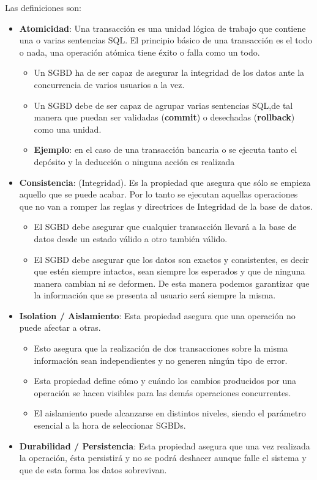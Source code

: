 Las definiciones son:

\begin{itemize}
    \item \textbf{Atomicidad}: Una transacción es una unidad lógica de trabajo que contiene una o varias sentencias SQL. El principio básico de una transacción es el todo o nada, una operación atómica tiene éxito o falla como un todo.
        \begin{itemize}
            \item Un SGBD ha de ser capaz de asegurar la integridad de los datos ante la concurrencia de varios usuarios a la vez.
            \item Un SGBD debe de ser capaz de agrupar varias sentencias SQL,de tal manera que puedan ser validadas (\textbf{commit}) o desechadas (\textbf{rollback}) como una unidad.
            \item \textbf{Ejemplo}: en el caso de una transacción bancaria o se ejecuta tanto el depósito y la deducción o ninguna acción es realizada
        \end{itemize}
    \item \textbf{Consistencia}: (Integridad). Es la propiedad que asegura que sólo se empieza aquello que se puede acabar. Por lo tanto se ejecutan aquellas operaciones que no van a romper las reglas y directrices de Integridad de la base de datos.
        \begin{itemize}
            \item El SGBD debe asegurar que cualquier transacción llevará a la base de datos desde un estado válido a otro también válido.
            \item El SGBD debe asegurar que los datos son exactos y consistentes, es decir que estén siempre intactos, sean siempre los esperados y que de ninguna manera cambian ni se deformen. De esta manera podemos garantizar que la información que se presenta al usuario será siempre la misma.
        \end{itemize}
    \item \textbf{Isolation / Aislamiento}: Esta propiedad asegura que una operación no puede afectar a otras.
        \begin{itemize}
            \item Esto asegura que la realización de dos transacciones sobre la misma información sean independientes y no generen ningún tipo de error.
            \item Esta propiedad define cómo y cuándo los cambios producidos por una operación se hacen visibles para las demás operaciones concurrentes.
            \item El aislamiento puede alcanzarse en distintos niveles, siendo el parámetro esencial a la hora de seleccionar SGBDs.
        \end{itemize}
    \item \textbf{Durabilidad / Persistencia}: Esta propiedad asegura que una vez realizada la operación, ésta persistirá y no se podrá deshacer aunque falle el sistema y que de esta forma los datos sobrevivan.
\end{itemize}

